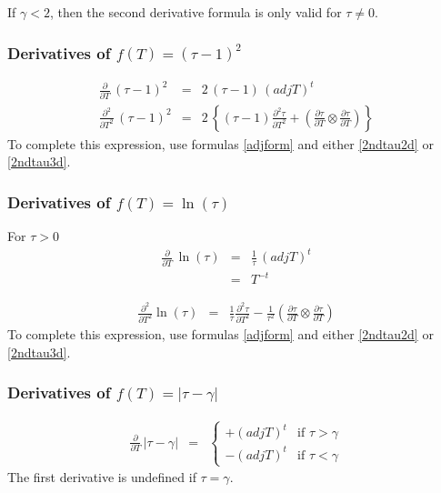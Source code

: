 \documentclass{report}
\begin{document}
\noindent If $\gamma < 2$, then the second derivative formula is only valid for $\tau \neq 0$. \newline

\subsubsection{Derivatives of $f(T)=(\tau-1)^2$}

\begin{eqnarray}
\frac{\partial}{\partial T} \, (\tau-1)^2 & = & 2 \, (\tau-1) \, (adj T)^t  \label{tauminus1} \\
\frac{\partial^2}{\partial T^2} \, (\tau-1)^2 & = & 2 \, \left\{ (\tau-1) \frac{\partial^2 \tau}{\partial T^2} + \left( \frac{\partial \tau}{\partial T} \otimes \frac{\partial \tau}{\partial T} \right) \right\}  \label{tm1}
\end{eqnarray}
To complete this expression, use formulas \ref{adjform} and either 
\ref{2ndtau2d} or \ref{2ndtau3d}. \newline

\subsubsection{Derivatives of $f(T)=\ln(\tau)$}

For $\tau>0$
\begin{eqnarray}
\frac{\partial}{\partial T} \, \ln(\tau) & = & \frac{1}{\tau} \, (adj T)^t \\
 & = & T^{-t}
\end{eqnarray}

\begin{eqnarray}
\frac{\partial^2}{\partial T^2} \ln(\tau) & = & \frac{1}{\tau} \frac{\partial^2 \tau}{\partial T^2} - \frac{1}{\tau^2} \left( \frac{\partial \tau}{\partial T} \otimes \frac{\partial \tau}{\partial T} \right)
\end{eqnarray}
To complete this expression, use formulas \ref{adjform} and either 
\ref{2ndtau2d} or \ref{2ndtau3d}. \newline

\subsubsection{Derivatives of $f(T)=|\tau-\gamma|$ \label{abstau}}

\begin{eqnarray}
\frac{\partial}{\partial T} \, |\tau-\gamma| & = & \left\{ \begin{array}{cc} 
+(adj T)^t & \mbox{if $\tau> \gamma$} \\
-(adj T)^t & \mbox{if $\tau< \gamma$}
\end{array} \right.
\end{eqnarray}
The first derivative is undefined if $\tau=\gamma$. \newline
\end{document}
